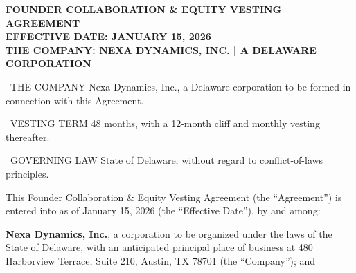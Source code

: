 \thispagestyle{firstpage}

\begin{tcolorbox}[
  colback=founderbg,
  colframe=founderink,
  arc=0mm,
  leftrule=5pt,
  rightrule=0pt,
  toprule=0pt,
  bottomrule=0pt,
  boxsep=12pt,
  left=15pt,
  right=15pt,
  top=15pt,
  bottom=15pt
]
  {\fontsize{19}{23}\selectfont\color{founderink}\sffamily\bfseries FOUNDER COLLABORATION \& EQUITY VESTING AGREEMENT}\\[8pt]
  {\fontsize{10}{14}\selectfont\color{founderslate}\sffamily\bfseries EFFECTIVE DATE: JANUARY 15, 2026}\\[4pt]
  {\fontsize{9}{12}\selectfont\color{founderteal}\sffamily\bfseries THE COMPANY: NEXA DYNAMICS, INC. \quad | \quad A DELAWARE CORPORATION}
\end{tcolorbox}

\vspace{1.2em}

\begin{minipage}[t]{0.31\textwidth}
\begin{termbox}{\faBuilding\ THE COMPANY}
Nexa Dynamics, Inc., a Delaware corporation to be formed in connection with this Agreement.
\end{termbox}
\end{minipage}\hfill
\begin{minipage}[t]{0.31\textwidth}
\begin{termbox}{\faCalendar\ VESTING TERM}
48 months, with a 12-month cliff and monthly vesting thereafter.
\end{termbox}
\end{minipage}\hfill
\begin{minipage}[t]{0.31\textwidth}
\begin{termbox}{\faGavel\ GOVERNING LAW}
State of Delaware, without regard to conflict-of-laws principles.
\end{termbox}
\end{minipage}
\par

\vspace{1.2em}

This Founder Collaboration \& Equity Vesting Agreement (the ``Agreement'') is entered into as of January 15, 2026 (the ``Effective Date''), by and among:

\textbf{Nexa Dynamics, Inc.}, a corporation to be organized under the laws of the State of Delaware, with an anticipated principal place of business at 480 Harborview Terrace, Suite 210, Austin, TX 78701 (the ``Company''); and

